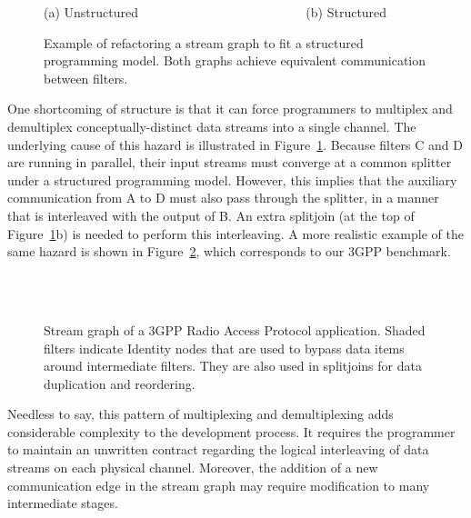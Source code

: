 \begin{figure}[t]
\centering
{}

(a) Unstructured ~~~~~~~~~~~~~~~~~~~~~~~~~ (b) Structured~~~~~~
\caption[Refactoring a stream graph to fit a structured programming
  model.]{Example of refactoring a stream graph to fit a structured
  programming model.  Both graphs achieve equivalent communication
  between filters.
\protect\label{fig:interleaving}}
\end{figure}

  One shortcoming of structure is that it can force programmers to
  multiplex and demultiplex conceptually-distinct data streams into a
  single channel.  The underlying cause of this hazard is illustrated
  in Figure~\ref{fig:interleaving}.  Because filters C and D are
  running in parallel, their input streams must converge at a common
  splitter under a structured programming model.  However, this
  implies that the auxiliary communication from A to D must also pass
  through the splitter, in a manner that is interleaved with the
  output of B.  An extra splitjoin (at the top of
  Figure~\ref{fig:interleaving}b) is needed to perform this
  interleaving.  A more realistic example of the same hazard is shown
  in Figure~\ref{fig:3gpp}, which corresponds to our 3GPP benchmark.

\begin{figure}[t!]
\vspace{-0.9in} ~ \\
\mbox{~}\hspace{2.03in}\begin{minipage}{4in}
\caption[Use of Identity filters is illustrated by the 3GPP benchmark.]{Stream graph of a 3GPP Radio Access
  Protocol application.  Shaded filters indicate Identity nodes that
  are used to bypass data items around intermediate filters.  They are
  also used in splitjoins for data duplication and
  reordering.\protect\label{fig:3gpp}}
\vspace{-0.5in}
\end{minipage}
\end{figure}

  Needless to say, this pattern of multiplexing and demultiplexing
  adds considerable complexity to the development process.  It
  requires the programmer to maintain an unwritten contract regarding
  the logical interleaving of data streams on each physical channel.
  Moreover, the addition of a new communication edge in the stream
  graph may require modification to many intermediate stages.

